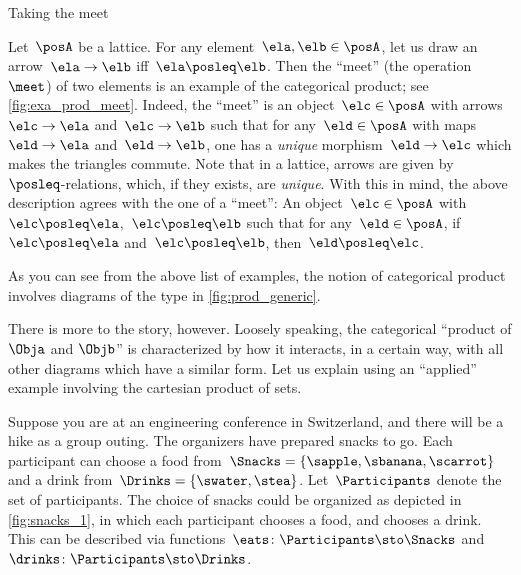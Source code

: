 \begin{marginfigure}
	\centering
	\caption{Taking the meet}
	\label{fig:exa_prod_meet}
\end{marginfigure}
\begin{example}
	\label{exa:meet-as-prod}
	Let~$\posA$ be a lattice.
	For any element~$\ela, \elb \in \posA$, let us draw an arrow~$\ela \to \elb$ iff~$\ela \posleq \elb$.
	Then the ``meet'' (the operation~$\meet$) of two elements is an example of the categorical product; see \cref{fig:exa_prod_meet}.
	Indeed, the ``meet'' is an object~$\elc \in \posA$ with arrows~$\elc\to \ela$ and~$\elc \to \elb$ such that for any~$\eld\in \posA$ with maps~$\eld\to \ela$ and~$\eld\to \elb$, one has a \emph{unique} morphism~$\eld\to \elc$ which makes the triangles commute.
	Note that in a lattice, arrows are given by~$\posleq$-relations, which, if they exists, are \emph{unique}.
	With this in mind, the above description agrees with the one of a ``meet'':
	An object~$\elc\in \posA$ with $\elc\posleq \ela$,~$\elc\posleq \elb$ such that for any~$\eld\in \posA$, if~$\elc\posleq \ela$ and~$\elc\posleq \elb$, then~$\eld\posleq \elc$.

\end{example}

\begin{marginfigure}
	\centering
	\caption{}
	\label{fig:prod_generic}
\end{marginfigure}

As you can see from the above list of examples, the notion of categorical product involves diagrams of the type in \cref{fig:prod_generic}.

There is more to the story, however.
Loosely speaking, the categorical ``product of $\Obja$ and $\Objb$'' is characterized by how it interacts, in a certain way, with all other diagrams which have a similar form.
Let us explain using an ``applied'' example involving the cartesian product of sets.

Suppose you are at an engineering conference in Switzerland, and there will be a hike as a group outing.
The organizers have prepared snacks to go.
Each participant can choose a food from~$\Snacks=\{\sapple,\sbanana,\scarrot\}$ and a drink from~$\Drinks=\{\swater,\stea\}$.
Let~$\Participants$ denote the set of participants.
The choice of snacks could be organized as depicted in \cref{fig:snacks_1}, in which each participant chooses a food, and chooses a drink.
This can be described via functions~$\eats \colon \Participants \sto \Snacks$ and~$\drinks \colon  \Participants \sto \Drinks$.


